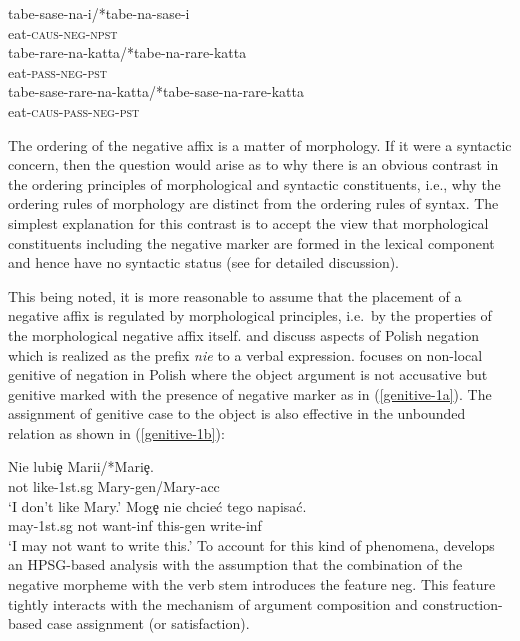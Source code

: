 \documentclass[output=paper
                ,modfonts
                		,nonflat
	        ,collection
	        ,collectionchapter
	        ,collectiontoclongg
 	        ,biblatex
                ,babelshorthands
                ,newtxmath
                ,draftmode
                ,colorlinks, citecolor=brown
]{./langsci/langscibook}
\begin{document}
{\begin{exe}
\begin{xlist}
\begin{exe}
\begin{xlist}
\eal
\ex
\gll tabe-sase-na-i/*tabe-na-sase-i \\
     eat-\textsc{caus}-\textsc{neg}-\textsc{npst} \\

\ex
\gll tabe-rare-na-katta/*tabe-na-rare-katta \\
     eat-\textsc{pass}-\textsc{neg}-\textsc{pst} \\

\ex
\gll tabe-sase-rare-na-katta/*tabe-sase-na-rare-katta \\
     eat-\textsc{caus}-\textsc{pass}-\textsc{neg}-\textsc{pst} \\
\zl

\noindent
The ordering of the negative affix is a matter of morphology.
If it were a syntactic concern, then
the question would arise as to why
there is an obvious contrast in the ordering principles
of morphological and syntactic constituents, i.e., why the ordering
rules of morphology are distinct from the ordering rules of syntax. The
simplest explanation for this contrast is to accept
the view that morphological constituents including the negative marker
are formed in the lexical component and hence have no syntactic
status (see \citet{Kim:00} for detailed discussion).

This being noted, it is more reasonable to assume that the placement of a
negative affix is regulated by morphological principles, i.e.\ by
the properties of the morphological negative affix itself.
\citet{PK:99} and \citet{Prz:00, Prz:01}
discuss aspects of Polish negation which is realized as the prefix
  {\it nie} to a verbal expression.
 \citet{Prz:00} focuses on non-local genitive of negation in Polish where the object argument is not accusative but genitive marked with the presence of negative marker as in (\ref{genitive-1a}). The assignment of genitive case to the object is also effective in
  the unbounded relation as shown in (\ref{genitive-1b}):

\eal
\ex \label{genitive-1a}
\gll Nie lubi\c{e} Marii/*Mari\c{e}. \\
     not like-1st.{\sc sg} Mary-{\sc gen}/Mary-{\sc acc}\\
\glt `I don't like Mary.'
\ex \label{genitive-1b}
\gll Mog\c{e} nie chcie\'{c} tego napisa\'{c}. \\
     may-1st.{\sc sg} not want-{\sc inf} this-{\sc gen} write-{\sc inf}\\
\glt `I may not want to write this.'
\zl
To account for this kind of phenomena, \citet{Prz:00} develops
an HPSG-based analysis with the assumption that the combination of the
negative morpheme with the verb stem introduces the feature {\sc neg}. This feature
tightly interacts with the mechanism of argument composition and construction-based case assignment (or satisfaction).


\end{xlist}
\end{exe}
\end{xlist}
\end{exe}}
\end{document}
